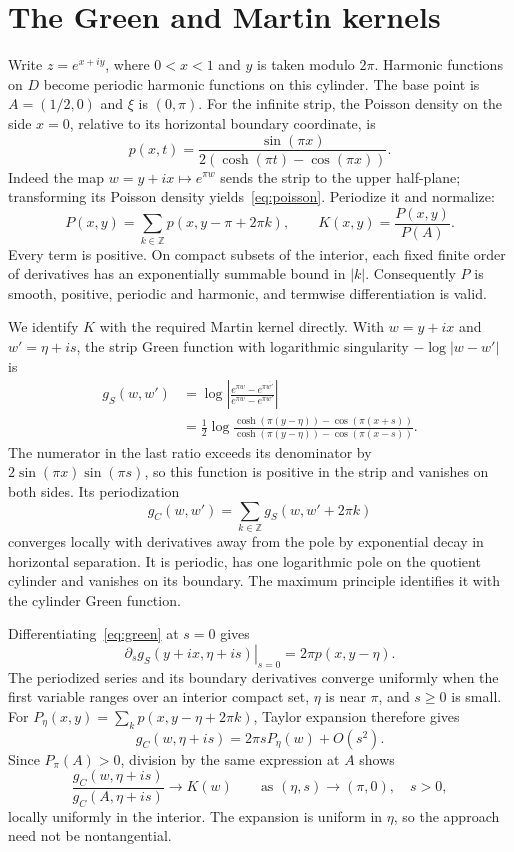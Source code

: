 \documentclass[11pt]{article}
\begin{document}
\section{The Green and Martin kernels}
Write $z=e^{x+iy}$, where $0<x<1$ and $y$ is taken modulo $2\pi$. Harmonic functions on $D$ become periodic harmonic functions on this cylinder. The base point is $A=(1/2,0)$ and $\xi$ is $(0,\pi)$. For the infinite strip, the Poisson density on the side $x=0$, relative to its horizontal boundary coordinate, is
\begin{equation}\label{eq:poisson}
 p(x,t)=\frac{\sin(\pi x)}{2(\cosh(\pi t)-\cos(\pi x))}.
\end{equation}
Indeed the map $w=y+ix\mapsto e^{\pi w}$ sends the strip to the upper half-plane; transforming its Poisson density yields~\eqref{eq:poisson}. Periodize it and normalize:
\begin{equation}\label{eq:kernel}
 P(x,y)=\sum_{k\in\mathbb Z}p(x,y-\pi+2\pi k),
 \qquad K(x,y)=\frac{P(x,y)}{P(A)}.
\end{equation}
Every term is positive. On compact subsets of the interior, each fixed finite order of derivatives has an exponentially summable bound in $|k|$. Consequently $P$ is smooth, positive, periodic and harmonic, and termwise differentiation is valid.

We identify $K$ with the required Martin kernel directly. With $w=y+ix$ and $w'=\eta+is$, the strip Green function with logarithmic singularity $-\log|w-w'|$ is
\begin{align}
g_S(w,w')
 &=\log\left|\frac{e^{\pi w}-e^{\pi\overline{w'}}}{e^{\pi w}-e^{\pi w'}}\right|\label{eq:green}\\
 &=\frac12\log\frac{\cosh(\pi(y-\eta))-\cos(\pi(x+s))}{\cosh(\pi(y-\eta))-\cos(\pi(x-s))}.\nonumber
\end{align}
The numerator in the last ratio exceeds its denominator by $2\sin(\pi x)\sin(\pi s)$, so this function is positive in the strip and vanishes on both sides. Its periodization
\[
 g_C(w,w')=\sum_{k\in\mathbb Z}g_S(w,w'+2\pi k)
\]
converges locally with derivatives away from the pole by exponential decay in horizontal separation. It is periodic, has one logarithmic pole on the quotient cylinder and vanishes on its boundary. The maximum principle identifies it with the cylinder Green function.

Differentiating~\eqref{eq:green} at $s=0$ gives
\[
 \left.\partial_s g_S(y+ix,\eta+is)\right|_{s=0}=2\pi p(x,y-\eta).
\]
The periodized series and its boundary derivatives converge uniformly when the first variable ranges over an interior compact set, $\eta$ is near $\pi$, and $s\geq0$ is small. For
$P_\eta(x,y)=\sum_k p(x,y-\eta+2\pi k)$, Taylor expansion therefore gives
\[
 g_C(w,\eta+is)=2\pi s P_\eta(w)+O(s^2).
\]
Since $P_\pi(A)>0$, division by the same expression at $A$ shows
\begin{equation}\label{eq:martin}
 \frac{g_C(w,\eta+is)}{g_C(A,\eta+is)}\longrightarrow K(w)
 \qquad\text{as }(\eta,s)\to(\pi,0),\quad s>0,
\end{equation}
locally uniformly in the interior. The expansion is uniform in $\eta$, so the approach need not be nontangential.
\end{document}
